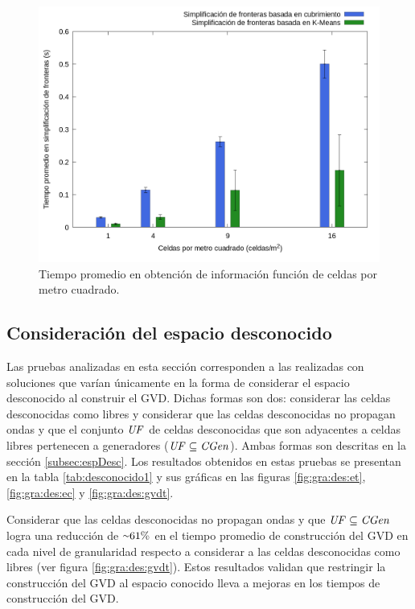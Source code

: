 \begin{figure}[H]
  \centerfloat

  \includegraphics[clip=true, width=\graphlen]{imagenes/graficas_chicas/graficas_histo_num/ident_obj/obj_id_time_mean.png}

  \caption{Tiempo promedio en obtención de información función de celdas por metro cuadrado.}\label{fig:gra:idobj:iobt}

\end{figure}

\subsection{Consideración del espacio desconocido}\label{sec:exp:desco}

Las pruebas analizadas en esta sección corresponden a las realizadas con
soluciones que varían únicamente en la forma de considerar el espacio
desconocido al construir el GVD. Dichas formas son dos: considerar las
celdas desconocidas como libres y considerar que las celdas desconocidas no
propagan ondas y que el conjunto $\mathit{UF}$ de celdas desconocidas que son
adyacentes a celdas libres pertenecen a generadores ($\mathit{UF} \subseteq
\mathit{CGen}$). Ambas formas son descritas en la sección \ref{subsec:espDesc}. Los
resultados obtenidos en estas pruebas se presentan en la tabla \ref{tab:desconocido1} y sus
gráficas en las figuras \ref{fig:gra:des:et}, \ref{fig:gra:des:ec} y
\ref{fig:gra:des:gvdt}.



Considerar que las celdas desconocidas no propagan ondas y que $\mathit{UF}
\subseteq \mathit{CGen}$ logra una reducción de ${\smallsim}61\%$ en el tiempo
promedio de construcción del GVD en cada nivel de granularidad respecto a
considerar a las celdas desconocidas como libres (ver figura \ref{fig:gra:des:gvdt}). Estos resultados validan que
restringir la construcción del GVD al espacio conocido lleva a mejoras en los
tiempos de construcción del GVD. 


